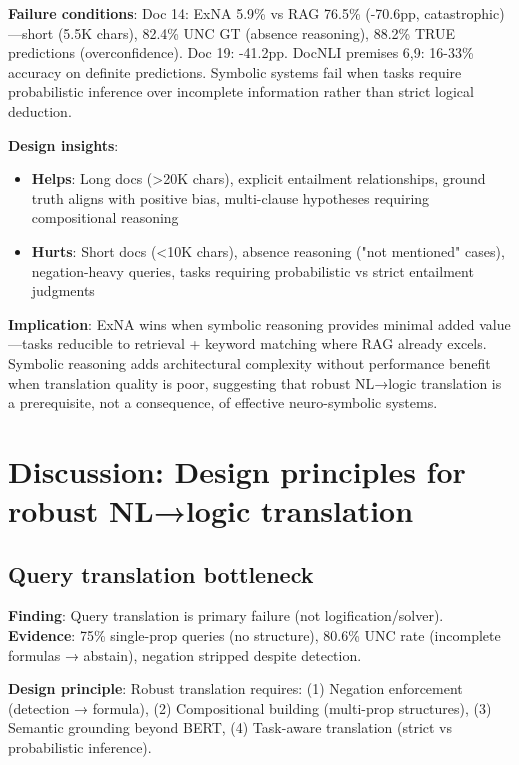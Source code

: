 \documentclass[12pt,a4paper]{article}
\begin{document}
\textbf{Failure conditions}: Doc 14: ExNA 5.9\% vs RAG 76.5\% (-70.6pp, catastrophic)—short (5.5K chars), 82.4\% UNC GT (absence reasoning), 88.2\% TRUE predictions (overconfidence). Doc 19: -41.2pp. DocNLI premises 6,9: 16-33\% accuracy on definite predictions. Symbolic systems fail when tasks require probabilistic inference over incomplete information rather than strict logical deduction.

\textbf{Design insights}: 
\begin{itemize}
\item \textbf{Helps}: Long docs (>20K chars), explicit entailment relationships, ground truth aligns with positive bias, multi-clause hypotheses requiring compositional reasoning
\item \textbf{Hurts}: Short docs (<10K chars), absence reasoning ("not mentioned" cases), negation-heavy queries, tasks requiring probabilistic vs strict entailment judgments
\end{itemize}

\noindent
\textbf{Implication}: ExNA wins when symbolic reasoning provides minimal added value—tasks reducible to retrieval + keyword matching where RAG already excels. Symbolic reasoning adds architectural complexity without performance benefit when translation quality is poor, suggesting that robust NL→logic translation is a prerequisite, not a consequence, of effective neuro-symbolic systems.


\section{Discussion: Design principles for robust NL→logic translation}

\subsection{Query translation bottleneck}

\textbf{Finding}: Query translation is primary failure (not logification/solver). \textbf{Evidence}: 75\% single-prop queries (no structure), 80.6\% UNC rate (incomplete formulas → abstain), negation stripped despite detection.

\noindent
\textbf{Design principle}: Robust translation requires: (1) Negation enforcement (detection → formula), (2) Compositional building (multi-prop structures), (3) Semantic grounding beyond BERT, (4) Task-aware translation (strict vs probabilistic inference).
\end{document}
